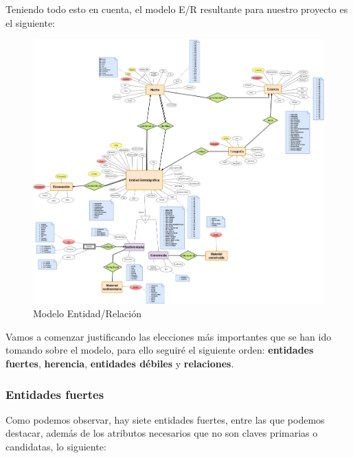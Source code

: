     Teniendo todo esto en cuenta, el modelo E/R resultante para nuestro proyecto es el
    siguiente:

        \begin{figure}[H]
            \centering
            \includegraphics[scale=0.10]{imagenes/E-RModel.png}
            \caption{Modelo Entidad/Relación}
            \label{fig:e-rmodel}
        \end{figure}

    Vamos a comenzar justificando las elecciones más importantes que se han ido tomando
    sobre el modelo, para ello seguiré el siguiente orden: \textbf{entidades fuertes},
    \textbf{herencia}, \textbf{entidades débiles} y \textbf{relaciones}.\\

    \subsubsection{Entidades fuertes}
    Como podemos observar, hay siete entidades fuertes, entre las que podemos destacar,
    además de los atributos necesarios que no son claves primarias o candidatas, lo siguiente:

